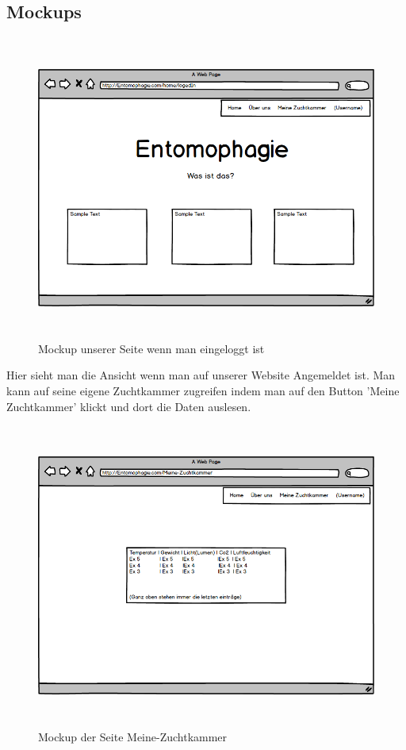 \subsection{Mockups}
\begin{figure}
\includegraphics[height=10cm]{figures/Logedin}
\caption{Mockup unserer Seite wenn man eingeloggt ist}
\end{figure}
Hier sieht man die Ansicht wenn man auf unserer Website Angemeldet ist. Man kann auf seine eigene Zuchtkammer zugreifen indem man auf den Button 'Meine Zuchtkammer' klickt und dort die Daten auslesen.
\newpage
\begin{figure}
\includegraphics[height=10cm]{figures/Meine-Zuchtkammer}
\caption{Mockup der Seite Meine-Zuchtkammer}
\end{figure}
